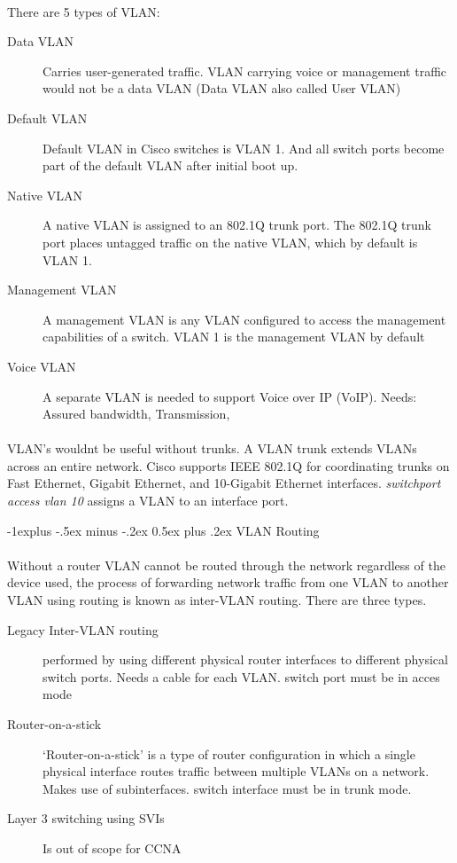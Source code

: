 \documentclass[10pt,landscape]{article}
\makeatletter
\renewcommand{\subsection}{\@startsection{subsection}{2}{0mm}%
                                {-1explus -.5ex minus -.2ex}%
                                {0.5ex plus .2ex}%
                                {\normalfont\normalsize\bfseries}}
\makeatother
\begin{document}
\begin{multicols}{3}
\paragraph{}
There are 5 types of VLAN:
\begin{description}
	\item[Data VLAN] Carries user-generated traffic. VLAN carrying voice or management traffic would not be a data VLAN (Data VLAN also called User VLAN)
	\item[Default VLAN] Default VLAN in Cisco switches is VLAN 1. And all switch ports become part of the default VLAN after initial boot up.
	\item[Native VLAN] A native VLAN is assigned to an 802.1Q trunk port. The 802.1Q trunk port places untagged traffic on the native VLAN, which by default is VLAN 1.
	\item[Management VLAN] A management VLAN is any VLAN configured to access the management capabilities of a switch. VLAN 1 is the management VLAN by default
	\item[Voice VLAN] A separate VLAN is needed to support Voice over IP (VoIP). Needs: Assured bandwidth, Transmission,
\end{description}
\paragraph{}
VLAN's wouldnt be useful without trunks. A VLAN trunk extends VLANs across an entire network. Cisco supports IEEE 802.1Q for coordinating trunks on Fast Ethernet, Gigabit Ethernet, and 10-Gigabit Ethernet interfaces. 
\textit{switchport access vlan 10 } assigns a VLAN to an interface port. 

\subsection{VLAN Routing}
\paragraph{}
Without a router VLAN cannot be routed through the network regardless of the device used, the process of forwarding network traffic from one VLAN to another VLAN using routing is known as inter-VLAN routing. There are three types. 
\begin{description}
	\item[Legacy Inter-VLAN routing] performed by using different physical router interfaces to different physical switch ports. Needs a cable for each VLAN. switch port must be in acces mode  
	\item[Router-on-a-stick] ‘Router-on-a-stick’ is a type of router configuration in which a single physical interface routes traffic between multiple VLANs on a network. Makes use of subinterfaces. switch interface must be in trunk mode.  
	\item[Layer 3 switching using SVIs] Is out of scope for CCNA 
\end{description}


\end{multicols}
\end{document}
